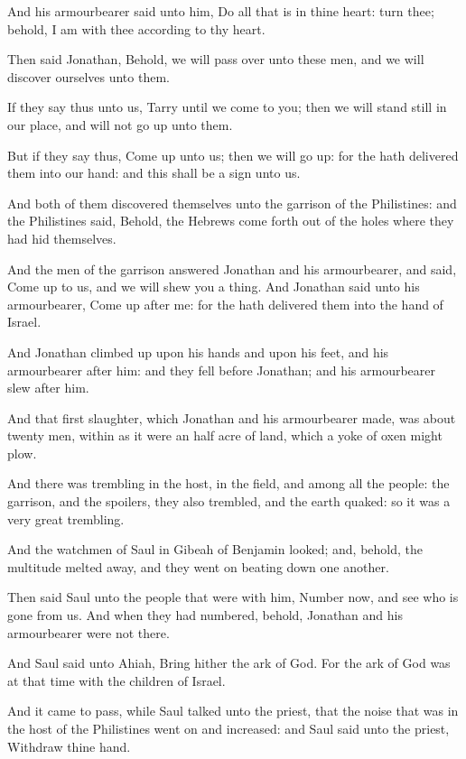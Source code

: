 \verse And his armourbearer said unto him, Do all that is in thine heart: turn thee; behold, I am with thee according to thy heart.

\verse Then said Jonathan, Behold, we will pass over unto these men, and we will discover ourselves unto them.

\verse If they say thus unto us, Tarry until we come to you; then we will stand still in our place, and will not go up unto them.

\verse But if they say thus, Come up unto us; then we will go up: for the \LORD hath delivered them into our hand: and this shall be a sign unto us.

\verse And both of them discovered themselves unto the garrison of the Philistines: and the Philistines said, Behold, the Hebrews come forth out of the holes where they had hid themselves.

\verse And the men of the garrison answered Jonathan and his armourbearer, and said, Come up to us, and we will shew you a thing.  And Jonathan said unto his armourbearer, Come up after me: for the \LORD hath delivered them into the hand of Israel.

\verse And Jonathan climbed up upon his hands and upon his feet, and his armourbearer after him: and they fell before Jonathan; and his armourbearer slew after him.

\verse And that first slaughter, which Jonathan and his armourbearer made, was about twenty men, within as it were an half acre of land, which a yoke of oxen might plow.

\verse And there was trembling in the host, in the field, and among all the people: the garrison, and the spoilers, they also trembled, and the earth quaked: so it was a very great trembling.

\verse And the watchmen of Saul in Gibeah of Benjamin looked; and, behold, the multitude melted away, and they went on beating down one another.

\verse Then said Saul unto the people that were with him, Number now, and see who is gone from us. And when they had numbered, behold, Jonathan and his armourbearer were not there.

\verse And Saul said unto Ahiah, Bring hither the ark of God. For the ark of God was at that time with the children of Israel.

\verse And it came to pass, while Saul talked unto the priest, that the noise that was in the host of the Philistines went on and increased: and Saul said unto the priest, Withdraw thine hand.

